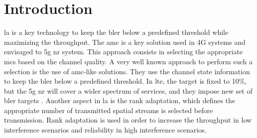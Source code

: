 \chapter{Introduction} \label{chp:introduction}

\Gls{la} is a key technology to keep the \gls{bler} below a predefined threshold while maximizing the throughput.
%
The \gls{amc} is a key solution used in 4G systems and envisaged to \gls{5g} \gls{nr} system.
%
This approach consists in selecting the appropriate \gls{mcs} based on the channel quality.
%
A very well known approach to perform such a selection is the use of \gls{amc}-like solutions.
%
They use the channel state information to keep the \gls{bler} below a predefined threshold.
%
In \gls{lte}, the target is fixed to 10\%, but the \gls{5g} \gls{nr} will cover a wider spectrum of services, and they impose new set of \gls{bler} targets \cite{Amin_2016,fantacci2009adaptive}.
%
Another aspect in \gls{la} is the rank adaptation, which defines the appropriate number of transmitted spatial streams is selected before transmission.
%
Rank adaptation is used in order to increase the throughput in low interference scenarios and reliability in high interference scenarios.

%
%

